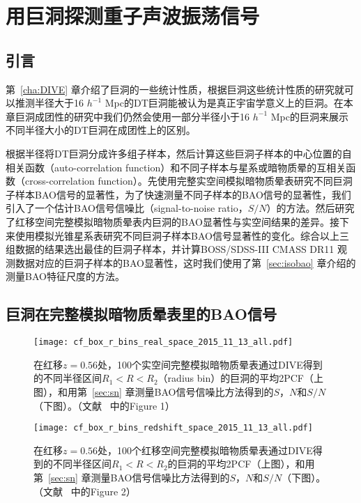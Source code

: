 \chapter{用巨洞探测重子声波振荡信号}
\label{cha:voidbao}

\section{引言}

第~\ref{cha:DIVE} 章介绍了巨洞的一些统计性质，根据巨洞这些统计性质的研究就可以推测半径大于16 $h^{-1}$ Mpc的DT巨洞能被认为是真正宇宙学意义上的巨洞。在本章巨洞成团性的研究中我们仍然会使用一部分半径小于16 $h^{-1}$ Mpc的巨洞来展示不同半径大小的DT巨洞在成团性上的区别。

根据半径将DT巨洞分成许多组子样本，然后计算这些巨洞子样本的中心位置的自相关函数（auto-correlation function）和不同子样本与星系或暗物质晕的互相关函数（cross-correlation function）。先使用完整实空间模拟暗物质晕表研究不同巨洞子样本BAO信号的显著性，为了快速测量不同子样本的BAO信号的显著性，我们引入了一个估计BAO信号信噪比（signal-to-noise ratio，$S/N$）的方法。然后研究了红移空间完整模拟暗物质晕表内巨洞的BAO显著性与实空间结果的差异。接下来使用模拟光锥星系表研究不同巨洞子样本BAO信号显著性的变化。综合以上三组数据的结果选出最佳的巨洞子样本，并计算BOSS/SDSS-III CMASS DR11
观测数据对应的巨洞子样本的BAO显著性，这时我们使用了第~\ref{sec:isobao} 章介绍的测量BAO特征尺度的方法。

\section{巨洞在完整模拟暗物质晕表里的BAO信号}
\label{sec:voidbaocomplete}

\begin{figure}
\centering
\texttt{[image: cf\_box\_r\_bins\_real\_space\_2015\_11\_13\_all.pdf]}
\caption{在红移$z = 0.56$处，100个实空间完整模拟暗物质晕表通过DIVE得到的不同半径区间$R_1 < R < R_2$（radius bin）的巨洞的平均2PCF（上图），和用第~\ref{sec:sn} 章测量BAO信号信噪比方法得到的$S$，$N$和$S/N$（下图）。（文献 ~中的Figure 1）}
\label{fig:cf_box_r_bins_real_space}
\end{figure}

\begin{figure}
\centering
\texttt{[image: cf\_box\_r\_bins\_redshift\_space\_2015\_11\_13\_all.pdf]}
\caption{在红移$z = 0.56$处，100个红移空间完整模拟暗物质晕表通过DIVE得到的不同半径区间$R_1 < R < R_2$的巨洞的平均2PCF（上图），和用第~\ref{sec:sn} 章测量BAO信号信噪比方法得到的$S$，$N$和$S/N$（下图）。（文献 ~中的Figure 2）}
\label{fig:cf_box_r_bins_redshift_space}
\end{figure}

